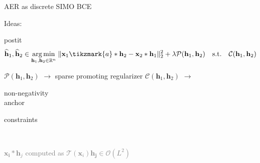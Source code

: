 \begin{frame}{AER as discrete SIMO BCE}
\begin{block}{Ideas:}
\begin{enumerate}
        \vspace*{.25em}

        \begin{beamercolorbox}[sep=.5em]{postit}
            \begin{equation*}
                \widehat{\mathbf{h}}_1, \widehat{\mathbf{h}}_2 \in
                \underset{\mathbf{h}_1, \mathbf{h}_2\in\kR^n}{\arg\min}\;
                \Vert \mathbf{x}_1 \tikzmark{a}\ast \mathbf{h}_2 - \mathbf{x}_2 \ast \mathbf{h}_1 \Vert_2^2
                + \lambda \mathcal{P}(\mathbf{h}_1, \mathbf{h}_2)
                \quad\text{s.t.}\quad\mathcal{C}(\mathbf{h}_1, \mathbf{h}_2)
            \end{equation*}

            \vspace*{0.1em}
            \begin{center}
                \footnotesize
                \hspace{5mm} $\mathcal{P}(\mathbf{h}_1, \mathbf{h}_2)$ $\longrightarrow$ sparse promoting regularizer
                \hfill \footnotesize $\mathcal{C}(\mathbf{h}_1, \mathbf{h}_2)$ $\longrightarrow$ \parbox{8em}{\centering non-negativity\\anchor}constraints
            \end{center}
        \end{beamercolorbox}

    \end{enumerate}

    \vspace{-3mm}
    \begin{center}
        \footnotesize
        \textcolor{mygreen}{\cmark}  \cite{tong1994blind} \qquad \textcolor{mygreen}{\cmark}  \cite{lin2007blind,lin2008blind} \qquad \textcolor{mygreen}{\cmark} \cite{aissa2008blind} \\
        \textcolor{mygreen}{\cmark} \cite{kowalczyk2013blind} \qquad \textcolor{mygreen}{\cmark} \cite{crocco2015room,crocco2016estimation}
    \end{center}

    \textcolor{gray}{\small $\mathbf{x_i} \ast \mathbf{h}_j$ computed as $\mathcal{T}(\mathbf{x}_i) \mathbf{h_j} \in \mathcal{O}(L^2)$}
    \end{block}


 \end{frame}

